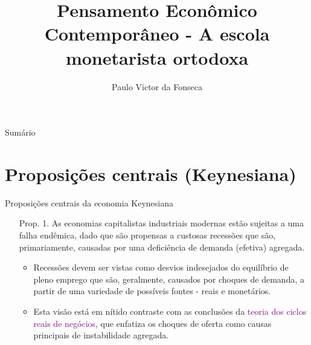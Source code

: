 \documentclass[10pt]{beamer}
\title[]{Pensamento Econômico Contemporâneo - A escola monetarista ortodoxa}
\author[]{Paulo Victor da Fonseca}
\date{}
\begin{document}
\begin{frame}[plain]
\end{frame}

\begin{frame}{Sumário}
    \tableofcontents
\end{frame}

\section{Proposições centrais (Keynesiana)}
\begin{frame}{Proposições centrais da economia Keynesiana}
    \begin{enumerate}
        \item[Prop. 1.] As economias capitalistas industriais modernas estão sujeitas a uma falha endêmica, dado que são propensas a custosas recessões que são, primariamente, causadas por uma deficiência de demanda (efetiva) agregada.
        \bigskip
        \begin{itemize}
            \item Recessões devem ser vistas como desvios indesejados do equilíbrio de pleno emprego que são, geralmente, causados por choques de demanda, a partir de uma variedade de possíveis fontes - reais e monetários.
            \bigskip
            \item Esta visão está em nítido contraste com as conclusões da \textcolor{purple}{teoria dos ciclos reais de negócios}, que enfatiza os choques de oferta como causas principais de instabilidade agregada.
        \end{itemize}
    \end{enumerate}
\end{frame}
\end{document}
